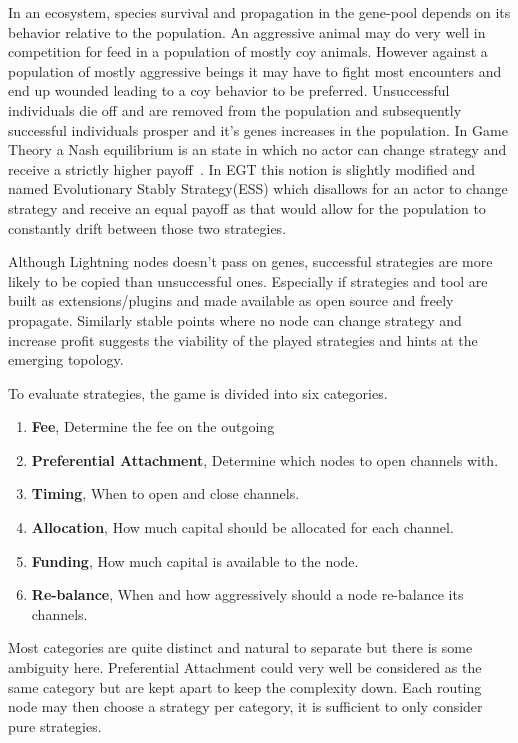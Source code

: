 In an ecosystem, species survival and propagation in the gene-pool depends on its behavior relative to the population. An aggressive animal may do very well in competition for feed in a population of mostly coy animals. However against a population of mostly aggressive beings it may have to fight most encounters and end up wounded leading to a coy behavior to be preferred. Unsuccessful individuals die off and are removed from the population and subsequently successful individuals prosper and it's genes increases in the population. In Game Theory a Nash equilibrium is an state in which no actor can change strategy and receive a strictly higher payoff~\cite{nash:equilibrium}. In EGT this notion is slightly modified and named Evolutionary Stably Strategy(ESS) which disallows for an actor to change strategy and receive an equal payoff as that would allow for the population to constantly drift between those two strategies. 

Although Lightning nodes doesn't pass on genes, successful strategies are more likely to be copied than unsuccessful ones. Especially if strategies and tool are built as extensions/plugins and made available as open source and freely propagate. Similarly stable points where no node can change strategy and increase profit suggests the viability of the played strategies and hints at the emerging topology. 

To evaluate strategies, the game is divided into six categories.

\begin{enumerate}
	\item \textbf{Fee}, Determine the fee on the outgoing
	\item \textbf{Preferential Attachment}, Determine which nodes to open channels with.
	\item \textbf{Timing}, When to open and close channels.
	\item \textbf{Allocation}, How much capital should be allocated for each channel.
	\item \textbf{Funding}, How much capital is available to the node.
	\item \textbf{Re-balance}, When and how aggressively should a node re-balance its channels. 
\end{enumerate}

Most categories are quite distinct and natural to separate but there is some ambiguity here. Preferential Attachment could very well be considered as the same category but are kept apart to keep the complexity down. Each routing node may then choose a strategy per category, it is sufficient to only consider pure strategies. 

